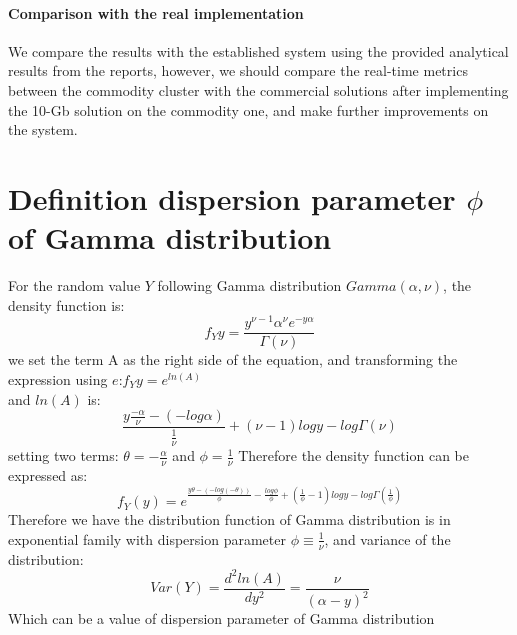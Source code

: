 \documentclass[11pt,openright,a4paper]{report}
\begin{document}
\subsubsection{Comparison with the real implementation}
We compare the results with the established system using the provided analytical results from the reports, however, we should compare the real-time metrics between the commodity cluster with the commercial solutions after implementing the 10-Gb solution on the commodity one, and make further improvements on the system.\\  




\appendix


\chapter{Definition dispersion parameter $\phi$ of Gamma distribution}
For the random value $Y$ following Gamma distribution $Gamma(\alpha,\nu)$, the density function is\cite{lukacs1955characterization}:\\
\begin{equation}
	f_{Y}{y}=\frac{y^{\nu-1}\alpha^{\nu}e^{-y\alpha}}{\Gamma(\nu)}
\end{equation}
we set the term A as the right side of the equation, and transforming the expression using $e$:$f_{Y}{y}=e^{ln(A)}$\\
and $ln(A)$ is:
\begin{equation}
	\frac{y\frac{-\alpha}{\nu}-(-log\alpha)}{\frac{1}{\nu}}+(\nu-1)logy-log\Gamma(\nu)
\end{equation}
setting two terms: $\theta = -\frac{\alpha}{\nu}$ and $\phi=\frac{1}{\nu}$
Therefore the density function can be expressed as:
\begin{equation}
	f_{Y}(y)=e^{\frac{y\theta-(-log(-\theta))}{\phi}-\frac{log\phi}{\phi}+(\frac{1}{\phi}-1)logy-log\Gamma(\frac{1}{\phi})}
\end{equation}
Therefore we have the distribution function of Gamma distribution is in exponential family with dispersion parameter $\phi \equiv \frac{1}{\nu}$, and variance of the distribution:
\begin{equation}
	Var(Y)=\frac{d^{2}ln(A)}{dy^{2}}=\frac{\nu}{(\alpha-y)^{2}}
\end{equation}
Which can be a value of dispersion parameter of Gamma distribution
\end{document}
